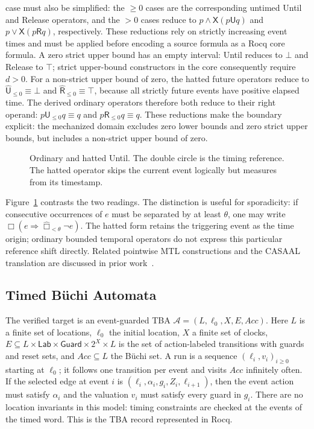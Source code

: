 \documentclass{ieeeaccess}
\newcommand{\Until}{\mathbin{\mathsf{U}}}
\newcommand{\Release}{\mathbin{\mathsf{R}}}
\newcommand{\hUntil}{\mathbin{\widehat{\mathsf{U}}}}
\newcommand{\hRelease}{\mathbin{\widehat{\mathsf{R}}}}
\newcommand{\Next}{\mathsf{X}}
\begin{document}
case must also be simplified: the $\ge0$ cases are the corresponding untimed
Until and Release operators, and the $>0$ cases reduce to
$p\land\Next(p\Until q)$ and $p\lor\Next(p\Release q)$,
respectively. These reductions rely on strictly increasing event
times and must be applied before encoding a source formula as a Rocq core
formula. A zero strict
upper bound has an empty interval: Until reduces to $\bot$ and Release to
$\top$; strict upper-bound constructors in the core consequently require
$d>0$. For a non-strict upper bound of zero, the hatted future operators reduce
to $\hUntil_{\le0}\equiv\bot$ and $\hRelease_{\le0}\equiv\top$, because all
strictly future events have positive elapsed time. The derived ordinary
operators therefore both reduce to their right operand:
$p\Until_{\le0}q\equiv q$ and $p\Release_{\le0}q\equiv q$. These reductions
make the boundary explicit: the mechanized domain excludes zero lower bounds
and zero strict upper bounds, but includes a non-strict upper bound of zero.

\begin{figure}[t]
\centering

\caption{Ordinary and hatted Until. The double circle is the timing reference.
The hatted operator skips the current event logically but measures from its
timestamp.}
\label{fig:hatted-until}
\end{figure}

Figure~\ref{fig:hatted-until} contrasts the two readings. The distinction is
useful for sporadicity: if consecutive occurrences of
$e$ must be separated by at least $\theta$, one may write
$\Box(e\Rightarrow\widehat{\Box}_{<\theta}\neg e)$. The hatted form retains
the triggering event as the time origin; ordinary bounded temporal
operators do not express this particular reference shift directly.
Related pointwise MTL constructions and the CASAAL translation are discussed
in prior work~\cite{ouaknine_worrell_lics05,bouyer_chevalier_markey_fsttcs05,li_spin7,casaal_tool}.

\subsection{Timed B\"uchi Automata}
\label{sec:tba}
The verified target is an event-guarded TBA
$\mathcal A=(L,\ell_0,X,E,\mathit{Acc})$. Here $L$ is a finite set of
locations, $\ell_0$ the initial location, $X$ a finite set of clocks,
$E\subseteq L\times\mathsf{Lab}\times\mathsf{Guard}\times 2^X\times L$
is the set of action-labeled transitions with guards and reset sets, and
$\mathit{Acc}\subseteq L$ the B\"uchi set. A run is a sequence
$(\ell_i,v_i)_{i\ge0}$ starting at $\ell_0$; it follows one transition per
event and visits $\mathit{Acc}$ infinitely often. If the selected edge at
event $i$ is $(\ell_i,\alpha_i,g_i,Z_i,\ell_{i+1})$, then the event action
must satisfy $\alpha_i$ and the valuation $v_i$ must satisfy every guard in
$g_i$. There are no location invariants in this model: timing constraints
are checked at the events of the timed word. This is the TBA record
represented in Rocq.
\end{document}

